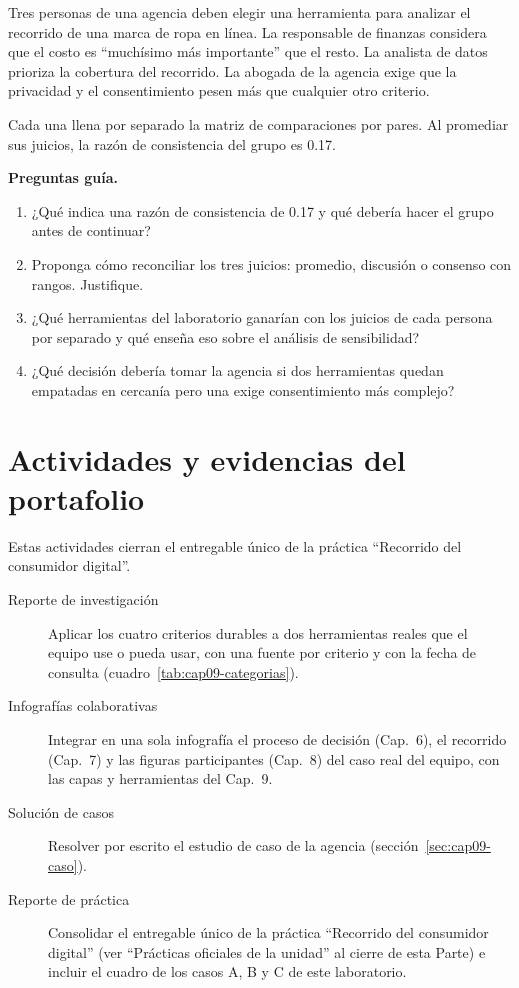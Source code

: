 \begin{casoFicticio}
Tres personas de una agencia deben elegir una herramienta para analizar el
recorrido de una marca de ropa en línea. La responsable de finanzas considera
que el costo es \enquote{muchísimo más importante} que el resto. La analista de
datos prioriza la cobertura del recorrido. La abogada de la agencia exige que
la privacidad y el consentimiento pesen más que cualquier otro criterio.

Cada una llena por separado la matriz de comparaciones por pares. Al
promediar sus juicios, la razón de consistencia del grupo es 0.17.

\textbf{Preguntas guía.}
\begin{enumerate}
  \item ¿Qué indica una razón de consistencia de 0.17 y qué debería hacer el
  grupo antes de continuar?
  \item Proponga cómo reconciliar los tres juicios: promedio, discusión o
  consenso con rangos. Justifique.
  \item ¿Qué herramientas del laboratorio ganarían con los juicios de cada
  persona por separado y qué enseña eso sobre el análisis de sensibilidad?
  \item ¿Qué decisión debería tomar la agencia si dos herramientas quedan
  empatadas en cercanía pero una exige consentimiento más complejo?
\end{enumerate}
\end{casoFicticio}

\section{Actividades y evidencias del portafolio}

Estas actividades cierran el entregable único de la práctica
\enquote{Recorrido del consumidor digital}.

\begin{description}
  \item[Reporte de investigación] Aplicar los cuatro criterios durables a dos
  herramientas reales que el equipo use o pueda usar, con una fuente por
  criterio y con la fecha de consulta (cuadro~\ref{tab:cap09-categorias}).
  \item[Infografías colaborativas] Integrar en una sola infografía el proceso
  de decisión (Cap.~6), el recorrido (Cap.~7) y las figuras participantes
  (Cap.~8) del caso real del equipo, con las capas y herramientas del
  Cap.~9.
  \item[Solución de casos] Resolver por escrito el estudio de caso de la
  agencia (sección~\ref{sec:cap09-caso}).
  \item[Reporte de práctica] Consolidar el entregable único de la práctica
  \enquote{Recorrido del consumidor digital} (ver \enquote{Prácticas oficiales
  de la unidad} al cierre de esta Parte) e incluir el cuadro de los casos
  A, B y C de este laboratorio.
\end{description}


